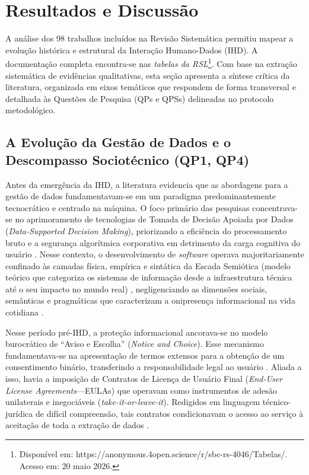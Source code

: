 \documentclass[12pt]{article}
\begin{document}
\section{Resultados e Discussão}
\label{sec:resultados}

A análise dos 98 trabalhos incluídos na Revisão Sistemática permitiu mapear a evolução histórica e estrutural da Interação Humano-Dados (IHD). A documentação completa encontra-se nas \emph{tabelas da RSL}\footnote{Disponível em: https://anonymous.4open.science/r/sbc-rs-4046/Tabelas/. Acesso em: 20 maio 2026.}. Com base na extração sistemática de evidências qualitativas, esta seção apresenta a síntese crítica da literatura, organizada em eixos temáticos que respondem de forma transversal e detalhada às Questões de Pesquisa (QPs e QPSs) delineadas no protocolo metodológico.

\subsection{A Evolução da Gestão de Dados e o Descompasso Sociotécnico (QP1, QP4)}

    Antes da emergência da IHD, a literatura evidencia que as abordagens para a gestão de dados fundamentavam-se em um paradigma predominantemente tecnocrático e centrado na máquina. O foco primário das pesquisas concentrava-se no aprimoramento de tecnologias de Tomada de Decisão Apoiada por Dados (\textit{Data-Supported Decision Making}), priorizando a eficiência do processamento bruto e a segurança algorítmica corporativa em detrimento da carga cognitiva do usuário \cite{calvetti2024human, Locoro2020}. Nesse contexto, o desenvolvimento de \textit{software} operava majoritariamente confinado às camadas física, empírica e sintática da Escada Semiótica (modelo teórico que categoriza os sistemas de informação desde a infraestrutura técnica até o seu impacto no mundo real) \cite{Hornung2015}, negligenciando as dimensões sociais, semânticas e pragmáticas que caracterizam a onipresença informacional na vida cotidiana \cite{Strey2019Human}.

    Nesse período pré-IHD, a proteção informacional ancorava-se no modelo burocrático de ``Aviso e Escolha'' (\textit{Notice and Choice}). Esse mecanismo fundamentava-se na apresentação de termos extensos para a obtenção de um consentimento binário, transferindo a responsabilidade legal ao usuário \cite{Jones2017}. Aliada a isso, havia a imposição de Contratos de Licença de Usuário Final (\textit{End-User License Agreements}---EULAs) que operavam como instrumentos de adesão unilaterais e inegociáveis (\textit{take-it-or-leave-it}). Redigidos em linguagem técnico-jurídica de difícil compreensão, tais contratos condicionavam o acesso ao serviço à aceitação de toda a extração de dados \cite{Hutton2017}.
\end{document}
